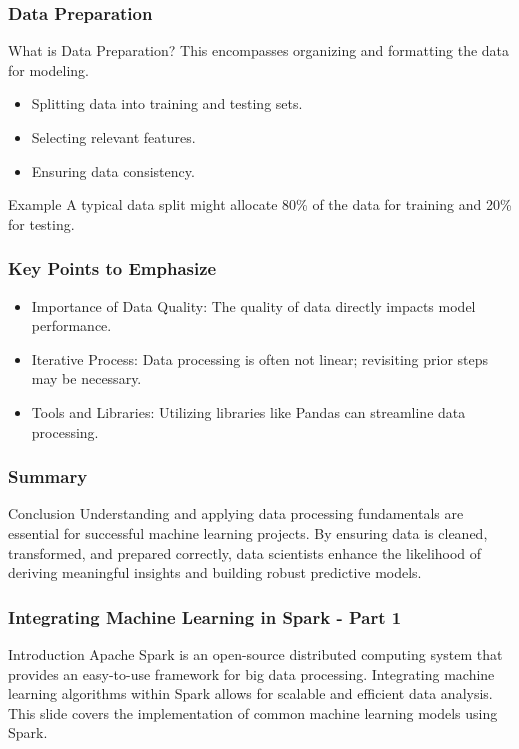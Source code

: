 \documentclass[aspectratio=169]{beamer}
\begin{document}
\begin{frame}[fragile]
    \frametitle{Data Preparation}
    \begin{block}{What is Data Preparation?}
        This encompasses organizing and formatting the data for modeling.
    \end{block}
    \begin{itemize}
        \item Splitting data into training and testing sets.
        \item Selecting relevant features.
        \item Ensuring data consistency.
    \end{itemize}
    \begin{block}{Example}
        A typical data split might allocate 80\% of the data for training and 20\% for testing.
    \end{block}
\end{frame}

\begin{frame}[fragile]
    \frametitle{Key Points to Emphasize}
    \begin{itemize}
        \item Importance of Data Quality: The quality of data directly impacts model performance.
        \item Iterative Process: Data processing is often not linear; revisiting prior steps may be necessary.
        \item Tools and Libraries: Utilizing libraries like Pandas can streamline data processing.
    \end{itemize}
\end{frame}

\begin{frame}[fragile]
    \frametitle{Summary}
    \begin{block}{Conclusion}
        Understanding and applying data processing fundamentals are essential for successful machine learning projects. By ensuring data is cleaned, transformed, and prepared correctly, data scientists enhance the likelihood of deriving meaningful insights and building robust predictive models.
    \end{block}
\end{frame}

\begin{frame}[fragile]
    \frametitle{Integrating Machine Learning in Spark - Part 1}
    \begin{block}{Introduction}
        Apache Spark is an open-source distributed computing system that provides an easy-to-use framework for big data processing. Integrating machine learning algorithms within Spark allows for scalable and efficient data analysis. This slide covers the implementation of common machine learning models using Spark.
    \end{block}
\end{frame}
\end{document}
